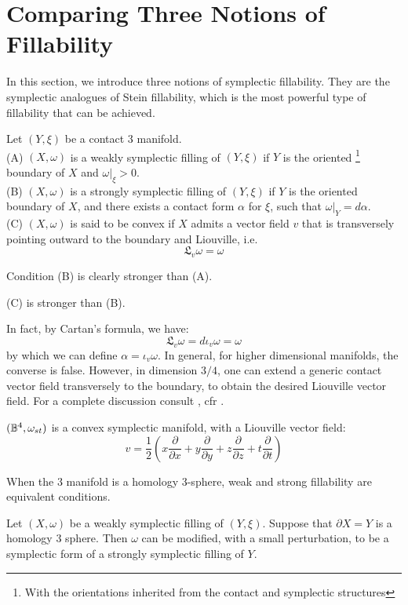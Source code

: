 \section{Comparing Three Notions of Fillability}
In this section, we introduce three notions of symplectic fillability. They are the symplectic analogues of Stein fillability, which is the most powerful type of fillability that can be achieved.
\begin{defn}Let $(Y, \xi)$ be a contact $3$ manifold. \\
(A) $(X, \omega)$ is a weakly symplectic filling of $(Y, \xi)$ if $Y$ is the oriented \footnote{With the orientations inherited from the contact and symplectic structures} boundary of $X$ and $\omega|_{\xi}>0$. \\
(B) $(X, \omega)$ is a strongly symplectic filling of $(Y, \xi)$ if $Y$ is the oriented boundary of $X$, and there exists a contact form $\alpha$ for $\xi$, such that $\omega|_Y = d\alpha$. \\
(C) $(X, \omega)$ is said to be convex if $X$ admits a vector field $v$ that is transversely pointing outward to the boundary and Liouville, i.e. $$
\mathfrak{L}_v\omega = \omega
$$
\end{defn}
Condition (B) is clearly stronger than (A).
\begin{obs}(C) is stronger than (B). 
\end{obs}
In fact, by Cartan's formula, we have: $$
\mathfrak{L}_v\omega = d \iota_v \omega = \omega
$$ by which we can define $\alpha = \iota_v\omega$.
In general, for higher dimensional manifolds, the converse is false. However, in dimension $3/4$, one can extend a generic contact vector field transversely to the boundary, to obtain the desired Liouville vector field. For a complete discussion consult \cite{etnyre1998symplectic}, cfr \cite{Etnyre_2004}.
\begin{ex}$(\mathbb{B}^4, \omega_{st})$ is a convex symplectic manifold, with a Liouville vector field: $$
v = \frac{1}{2}(x\frac{\partial}{\partial x} + y\frac{\partial}{\partial y} +z\frac{\partial}{\partial z} + t\frac{\partial}{\partial t})
$$
\end{ex}
When the $3$ manifold is a homology 3-sphere, weak and strong fillability are equivalent conditions.
\begin{prop}\cite{oo:simple}\label{osha}
Let $(X, \omega)$ be a weakly symplectic filling of $(Y, \xi)$. Suppose that $\partial X = Y$ is a homology $3$ sphere. Then $\omega$ can be modified, with a small perturbation, to be a symplectic form of a strongly symplectic filling of $Y$.
\end{prop}









